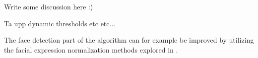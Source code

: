 Write some discussion here :)

Ta upp dynamic thresholds etc etc...

The face detection part of the algorithm can for example be improved by utilizing the facial expression normalization methods explored in  \cite{facialExpressions}.
